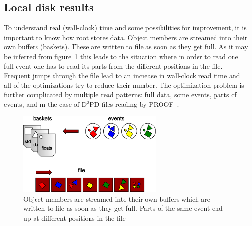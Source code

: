 \documentclass[a4paper]{jpconf}
\begin{document}
\subsection{Local disk results}
To understand real (wall-clock) time and some possibilities for improvement, it is important to know how root stores data. Object members are streamed into their own buffers (baskets). These are written to file as soon as they get full. As it may be inferred from figure~\ref{fig_ROOT_storage} this leads to the situation where in order to read one full event one has to read its parts from the different positions in the file. Frequent jumps through the file lead to an increase in wall-clock read time and all of the optimizations try to reduce their number. The optimization problem is further complicated by multiple read patterns: full data, some events, parts of events, and in the case of D$^3$PD files reading by PROOF~\cite{proof}.

\begin{figure}[h]
\includegraphics[width=17pc]{ROOT_storage.eps}\hspace{2pc}%
\begin{minipage}[b]{17pc}\caption{\label{fig_ROOT_storage}Object members are streamed into their own buffers which are written to file as soon as they get full. Parts of the same event end up at different positions in the file}
\end{minipage}
\end{figure}
  
\end{document}
